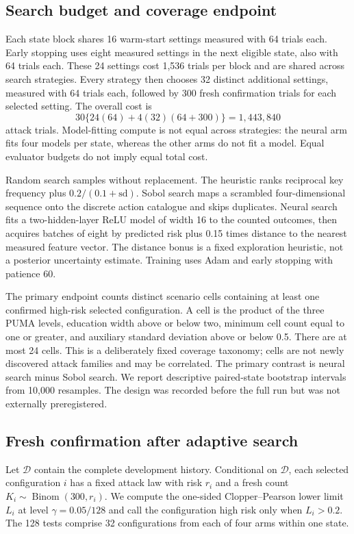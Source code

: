 \documentclass[11pt]{article}
\begin{document}
\subsection{Search budget and coverage endpoint}
Each state block shares 16 warm-start settings measured with 64 trials each. Early stopping uses eight measured settings in the next eligible state, also with 64 trials each. These 24 settings cost 1,536 trials per block and are shared across search strategies. Every strategy then chooses 32 distinct additional settings, measured with 64 trials each, followed by 300 fresh confirmation trials for each selected setting. The overall cost is
\[
30\{24(64)+4(32)(64+300)\}=1,443,840
\]
attack trials. Model-fitting compute is not equal across strategies: the neural arm fits four models per state, whereas the other arms do not fit a model. Equal evaluator budgets do not imply equal total cost.

Random search samples without replacement. The heuristic ranks reciprocal key frequency plus $0.2/(0.1+\mathrm{sd})$. Sobol search maps a scrambled four-dimensional sequence onto the discrete action catalogue and skips duplicates. Neural search fits a two-hidden-layer ReLU model of width 16 to the counted outcomes, then acquires batches of eight by predicted risk plus 0.15 times distance to the nearest measured feature vector. The distance bonus is a fixed exploration heuristic, not a posterior uncertainty estimate. Training uses Adam and early stopping with patience 60.

The primary endpoint counts distinct scenario cells containing at least one confirmed high-risk selected configuration. A cell is the product of the three PUMA levels, education width above or below two, minimum cell count equal to one or greater, and auxiliary standard deviation above or below 0.5. There are at most 24 cells. This is a deliberately fixed coverage taxonomy; cells are not newly discovered attack families and may be correlated. The primary contrast is neural search minus Sobol search. We report descriptive paired-state bootstrap intervals from 10,000 resamples. The design was recorded before the full run but was not externally preregistered.

\subsection{Fresh confirmation after adaptive search}
Let $\mathcal D$ contain the complete development history. Conditional on $\mathcal D$, each selected configuration $i$ has a fixed attack law with risk $r_i$ and a fresh count $K_i\sim\operatorname{Binom}(300,r_i)$. We compute the one-sided Clopper--Pearson lower limit $L_i$ at level $\gamma=0.05/128$ and call the configuration high risk only when $L_i>0.2$. The 128 tests comprise 32 configurations from each of four arms within one state.
\end{document}
